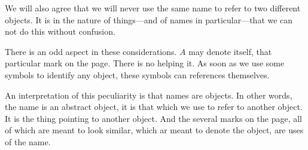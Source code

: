 

We will also agree that we will never use the same name to refer to two different objects.
It is in the nature of things---and of names in particular---that we can not do this without confusion.


There is an odd aspect in these considerations.
$A$ may denote itself, that particular mark on the page.
There is no helping it.
As soon as we use some symbols to identify any object, these symbols can references themselves.

An interpretation of this peculiarity is that names are objects.
In other words, the name is an abstract object, it is that which we use to refer to another object.
It is the thing pointing to another object.
And the several marks on the page, all of which are meant to look similar, which ar meant to denote the object, are uses of the name.

